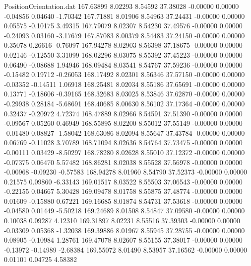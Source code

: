\begin{filecontents}{PositionOrientation.dat}
 167.63899    8.02293    8.54592    37.38028   -0.00000    0.00000   -0.04856    0.04640   -1.70342
 167.71881    8.01906    8.54963    37.24431   -0.00000    0.00000    0.05575   -0.10175    3.49315
 167.79079    8.02307    8.54230    37.49576   -0.00000    0.00000   -0.24093    0.03160   -3.17679
 167.87083    8.00379    8.54483    37.24150   -0.00000    0.00000    0.35078    0.26616   -0.76097
 167.94278    8.02903    8.56398    37.18675   -0.00000    0.00000    0.02146   -0.12550    3.31099
 168.02296    8.03075    8.55392    37.45223   -0.00000    0.00000    0.06490   -0.08688    1.94946
 168.09484    8.03541    8.54767    37.59236   -0.00000    0.00000   -0.15482    0.19712   -0.26053
 168.17492    8.02301    8.56346    37.57150   -0.00000    0.00000   -0.03352   -0.14511    1.06918
 168.25481    8.02034    8.55186    37.65691   -0.00000    0.00000    0.13771   -0.18606   -0.39165
 168.32683    8.03025    8.53846    37.62870   -0.00000    0.00000   -0.29938    0.28184   -5.68691
 168.40685    8.00630    8.56102    37.17364   -0.00000    0.00000    0.32437   -0.20972    4.72374
 168.47889    8.02966    8.54591    37.51390   -0.00000    0.00000   -0.09567    0.05260    0.46949
 168.55895    8.02200    8.55012    37.55149   -0.00000    0.00000   -0.01480    0.08827   -1.58042
 168.63086    8.02094    8.55647    37.43784   -0.00000    0.00000    0.06769   -0.11028    3.70789
 168.71094    8.02636    8.54764    37.73475   -0.00000    0.00000   -0.00111    0.03429   -8.50297
 168.78280    8.02628    8.55010    37.12372   -0.00000    0.00000   -0.07375    0.06470    5.57482
 168.86281    8.02038    8.55528    37.56978   -0.00000    0.00000   -0.00968   -0.09230   -0.57583
 168.94278    8.01960    8.54790    37.52373   -0.00000    0.00000    0.21575    0.09860   -6.33143
 169.01517    8.03522    8.55503    37.06543   -0.00000    0.00000   -0.22155    0.04667    5.30428
 169.09478    8.01758    8.55875    37.48774   -0.00000    0.00000    0.01609   -0.15880    0.67221
 169.16685    8.01874    8.54731    37.53618   -0.00000    0.00000   -0.04580    0.01449   -5.50218
 169.24689    8.01508    8.54847    37.09580   -0.00000    0.00000    0.10038    0.09287    4.12310
 169.31897    8.02231    8.55516    37.39303   -0.00000    0.00000   -0.03309    0.05368   -1.32038
 169.39886    8.01967    8.55945    37.28755   -0.00000    0.00000    0.08905   -0.10984    1.28761
 169.47078    8.02607    8.55155    37.38017   -0.00000    0.00000   -0.13972   -0.14989   -2.68384
 169.55072    8.01490    8.53957    37.16562   -0.00000    0.00000    0.01101    0.04725    4.58382

\end{filecontents}
